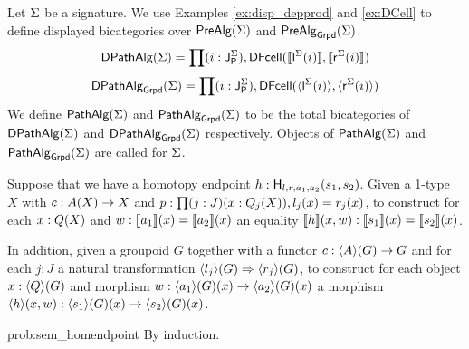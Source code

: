 \begin{definition}
\label{def:pathalg}
Let $\sign$ be a signature.
We use Examples \ref{ex:disp_depprod} and \ref{ex:DCell} to define displayed bicategories over $\prealg{\sign}$ and $\prealgG{\sign}$.
\[
\pathalgMD(\sign) = \depprod{(i : \pathlabel[\sign])}{\DCell(\semE{\pathleft[\sign](i)},\semE{\pathright[\sign](i)})}
\]
\[
\pathalgGD{\sign} = \depprod{(i : \pathlabel[\sign])}{\DCell(\semEG{\pathleft[\sign](i)},\semEG{\pathright[\sign](i)})}
\]
We define $\pathalgM(\sign)$ and $\pathalgG{\sign}$ to be the total bicategories of $\pathalgMD(\sign)$ and $\pathalgGD{\sign}$ respectively.
Objects of $\pathalgM(\sign)$ and $\pathalgG{\sign}$ are called  for $\sign$.
\end{definition}

\begin{problem}
\label{prob:sem_homendpoint}
Suppose that we have a homotopy endpoint $h : \homotendpoint{l}{r}{a_1}{a_2}{s_1}{s_2}$.
Given a 1-type $X$ with $c : \polyAct{A}{X} \rightarrow X$ and $p : \depprod{(j : J) (x : \polyAct{Q_j}{X})}{l_j(x) = r_j(x)}$,
to construct for each $x : \polyAct{Q}{X}$ and $w : \semE{a_1}(x) = \semE{a_2}(x)$
an equality $\semH{h}(x, w) : \semE{s_1}(x) = \semE{s_2}(x)$.

In addition, given a groupoid $G$ together with a functor $c : \semPG{A}{(G)} \rightarrow G$ and for each $j : J$ a natural transformation $\semEG{l_j}(G) \twocell \semEG{r_j}(G)$,
to construct for each object $x : \semPG{Q}{(G)}$ and morphism $w : \semEG{a_1}(G)(x) \rightarrow \semEG{a_2}(G)(x)$
a morphism $\semHG{h}(x, w) : \semEG{s_1}(G)(x) \rightarrow \semEG{s_2}(G)(x)$.
\end{problem}

\begin{construction}{prob:sem_homendpoint}
By induction.
\end{construction}

